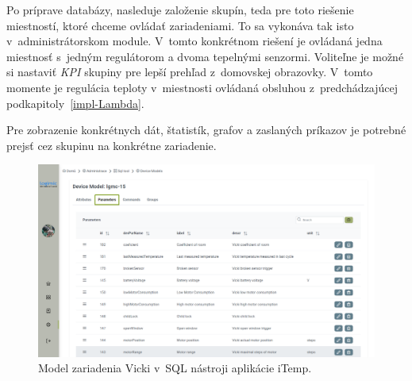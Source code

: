Po príprave databázy, nasleduje založenie skupín, teda pre toto riešenie miestností, ktoré chceme ovládať zariadeniami. 
To sa vykonáva tak isto v~administrátorskom module. 
V~tomto konkrétnom riešení je ovládaná jedna miestnosť s~jedným regulátorom a dvoma tepelnými senzormi. 
Voliteľne je možné si nastaviť \emph{KPI} skupiny pre lepší prehľad z~domovskej obrazovky. V~tomto momente je regulácia teploty v~miestnosti ovládaná obsluhou z~predchádzajúcej  podkapitoly~\ref{impl-Lambda}.

Pre zobrazenie konkrétnych dát, štatistík, grafov a zaslaných príkazov je potrebné prejsť cez skupinu na konkrétne zariadenie.

\begin{figure}[H]
    \centering
    \includegraphics[width=\columnwidth]{obrazky-figures/Screenshot_13.png}
    \caption{Model zariadenia Vicki v~SQL nástroji aplikácie iTemp.}
    \label{fig:model}
\end{figure}